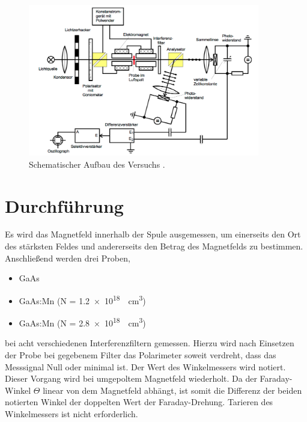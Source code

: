 \begin{figure}[h]
    \centering
    \includegraphics[width=0.9\textwidth]{graphics/setup.png}
    \caption{Schematischer Aufbau des Versuchs \cite{skript}.}
    \label{setup}
\end{figure}
\newpage
\section{Durchführung}
\label{sec:Durchfuehrung}
Es wird das Magnetfeld innerhalb der Spule ausgemessen, um einerseits den Ort des stärksten Feldes und andererseits den Betrag des Magnetfelds zu bestimmen.
Anschließend werden drei Proben,
\begin{itemize}
    \item{GaAs}
    \item{GaAs:Mn (N = \SI{1.2e18}{\per\centi\meter\cubed})}
    \item{GaAs:Mn (N = \SI{2.8e18}{\per\centi\meter\cubed})}
\end{itemize}
bei acht verschiedenen Interferenzfiltern gemessen.
Hierzu wird nach Einsetzen der Probe bei gegebenem Filter das Polarimeter soweit verdreht,
dass das Messsignal Null oder minimal ist. Der Wert des Winkelmessers wird notiert.
Dieser Vorgang wird bei umgepoltem Magnetfeld wiederholt. Da der Faraday-Winkel $\Theta$ linear von dem Magnetfeld abhängt,
ist somit die Differenz der beiden notierten Winkel der doppelten Wert der Faraday-Drehung. Tarieren des Winkelmessers ist nicht erforderlich.
